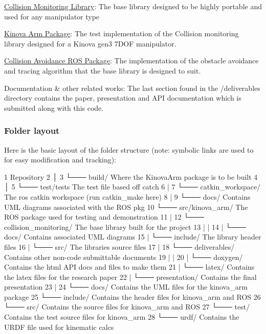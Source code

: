 \begin{DoxyItemize}
\item \hyperlink{collision__monitoring_2_r_e_a_d_m_e_8md}{Collision Monitoring Library}\+: The base library designed to be highly portable and used for any manipulator type
\item \hyperlink{md_src_README}{Kinova Arm Package}\+: The test implementation of the Collision monitoring library designed for a Kinova gen3 7\+D\+OF manipulator.
\item \hyperlink{md_catkin_workspace_README}{Collision Avoidance R\+OS Package}\+: The implementation of the obstacle avoidance and tracing algorithm that the base library is designed to suit.
\item Documentation \& other related works\+: The last section found in the /deliverables directory contains the paper, presentation and A\+PI documentation which is submitted along with this code.
\end{DoxyItemize}

\subsubsection*{Folder layout}

Here is the basic layout of the folder structure (note\+: symbolic links are used to for easy modification and tracking)\+:


\begin{DoxyCode}
1 Repository
2 │
3 └─── build/                    Where the KinovaArm package is to be built
4 │
5 └─── test/tests                The test file based off catch
6 |
7 └─── catkin\_workspace/         The ros catkin workspace (run catkin\_make here)
8 |
9 └─── docs/                     Contains UML diagrams associated with the ROS pkg
10 └─── src/kinova\_arm/           The ROS package used for testing and demonstration
11 |
12 └─── collision\_monitoring/     The base library built for the project
13 |   |
14 |   └─── docs/                 Contains associated UML diagrams
15 |   └─── include/              The library header files
16 |   └─── src/                  The libraries source files
17 |
18 └─── deliverables/             Contains other non-code submittable documents
19 |   |
20 |   └─── doxygen/              Contains the html API docs and files to make them
21 |   └─── latex/                Contains the latex files for the research paper
22 |   └─── presentation/         Contains the final presentation
23 |
24 └─── docs/                     Contains the UML files for the kinova\_arm package
25 └─── include/                  Contains the header files for kinova\_arm and ROS
26 └─── src/                      Contains the source files for kinova\_arm and ROS
27 └─── test/                     Contains the test source files for kinova\_arm
28 └─── urdf/                     Contains the URDF file used for kinematic calcs
\end{DoxyCode}


